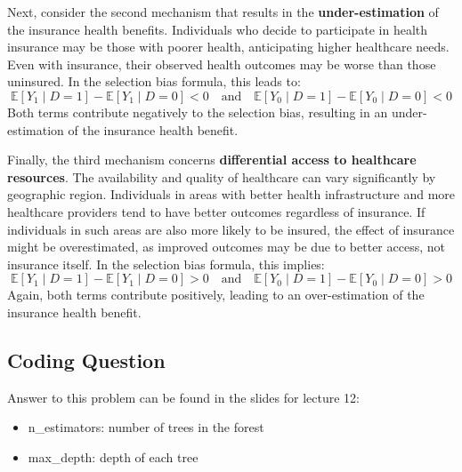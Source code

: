 \documentclass{article}
\begin{document}
Next, consider the second mechanism that results in the \textbf{under-estimation} of the insurance health benefits. Individuals who decide to participate in health insurance may be those with poorer health, anticipating higher healthcare needs. Even with insurance, their observed health outcomes may be worse than those uninsured. In the selection bias formula, this leads to:
\[
\mathbb{E}[Y_1 \mid D = 1] - \mathbb{E}[Y_1 \mid D = 0] < 0 \quad \text{and} \quad \mathbb{E}[Y_0 \mid D = 1] - \mathbb{E}[Y_0 \mid D = 0] < 0
\]
Both terms contribute negatively to the selection bias, resulting in an under-estimation of the insurance health benefit.

Finally, the third mechanism concerns \textbf{differential access to healthcare resources}. The availability and quality of healthcare can vary significantly by geographic region. Individuals in areas with better health infrastructure and more healthcare providers tend to have better outcomes regardless of insurance. If individuals in such areas are also more likely to be insured, the effect of insurance might be overestimated, as improved outcomes may be due to better access, not insurance itself. In the selection bias formula, this implies:
\[
\mathbb{E}[Y_1 \mid D = 1] - \mathbb{E}[Y_1 \mid D = 0] > 0 \quad \text{and} \quad \mathbb{E}[Y_0 \mid D = 1] - \mathbb{E}[Y_0 \mid D = 0] > 0
\]
Again, both terms contribute positively, leading to an over-estimation of the insurance health benefit. 

\subsection*{Coding Question}
Answer to this problem can be found in the slides for lecture 12:
\begin{itemize}
    \item{n\_estimators: number of trees in the forest}
    \item{max\_depth: depth of each tree}
\end{itemize}
\end{document}
